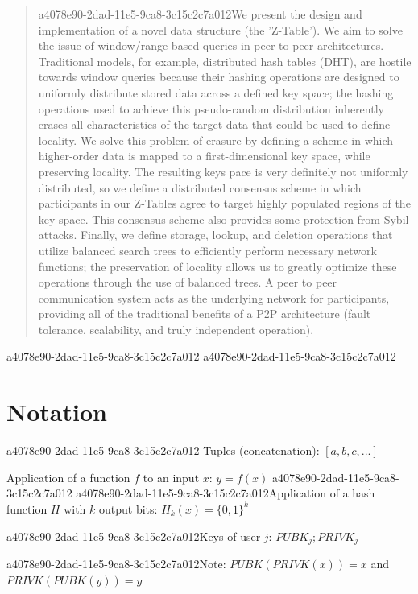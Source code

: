 \documentclass[12pt]{article}
\begin{document}
\maketitle

\begin{abstract}
a4078e90-2dad-11e5-9ca8-3c15c2c7a012We present the design and implementation of a novel data structure (the 'Z-Table'). We aim to solve the issue of window/range-based queries in peer to peer architectures. Traditional models, for example,  distributed hash tables (DHT), are hostile towards window queries because their hashing operations are designed to uniformly distribute stored data across a defined key space; the hashing operations used to achieve this pseudo-random distribution inherently erases all characteristics of the target data that could be used to define locality. We solve this problem of erasure by defining a scheme in which higher-order data is mapped to a first-dimensional key space, while preserving locality. The resulting keys pace is very definitely not uniformly distributed, so we define a distributed consensus scheme in which participants in our Z-Tables agree to target highly populated regions of the key space. This consensus scheme also provides some protection from Sybil attacks. Finally, we define storage, lookup, and deletion operations that utilize balanced search trees to efficiently perform necessary network functions; the preservation of locality allows us to greatly optimize these operations through the use of balanced trees. A peer to peer communication system acts as the underlying network for participants, providing all of the traditional benefits of a P2P architecture (fault tolerance, scalability, and truly independent operation).
\end{abstract}
a4078e90-2dad-11e5-9ca8-3c15c2c7a012
a4078e90-2dad-11e5-9ca8-3c15c2c7a012\section{Notation}
a4078e90-2dad-11e5-9ca8-3c15c2c7a012
Tuples (concatenation): $[a,b,c,...]$

Application of a function $f$ to an input $x$: $y=f(x)$
a4078e90-2dad-11e5-9ca8-3c15c2c7a012
a4078e90-2dad-11e5-9ca8-3c15c2c7a012Application of a hash function $H$ with $k$ output bits: $H_{k}(x) = \{0,1\}^k$

a4078e90-2dad-11e5-9ca8-3c15c2c7a012Keys of user $j$: $ PUBK_j; PRIVK_j $

a4078e90-2dad-11e5-9ca8-3c15c2c7a012Note: $PUBK(PRIVK(x)) = x$ and $PRIVK(PUBK(y)) = y$~
\end{document}
